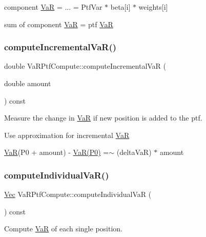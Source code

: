 component \hyperlink{classVaR}{VaR} = ... = Ptf\+Var $\ast$ beta\mbox{[}i\mbox{]} $\ast$ weights\mbox{[}i\mbox{]}

sum of component \hyperlink{classVaR}{VaR} = ptf \hyperlink{classVaR}{VaR} \hypertarget{classVaRPtfCompute_a21a920a3cd05000dbb4aa504ee0f7bc1}{}\label{classVaRPtfCompute_a21a920a3cd05000dbb4aa504ee0f7bc1} 
\subsubsection{\texorpdfstring{compute\+Incremental\+Va\+R()}{computeIncrementalVaR()}}
{\footnotesize\ttfamily double Va\+R\+Ptf\+Compute\+::compute\+Incremental\+VaR (\begin{DoxyParamCaption}\item[{double}]{amount }\end{DoxyParamCaption}) const}



Measure the change in \hyperlink{classVaR}{VaR} if new position is added to the ptf. 

Use approximation for incremental \hyperlink{classVaR}{VaR}

\hyperlink{classVaR}{VaR}(P0 + amount) -\/ \hyperlink{classVaR}{Va\+R(\+P0)} =$\sim$ (delta\+VaR)\textquotesingle{} $\ast$ amount \hypertarget{classVaRPtfCompute_a80964859df50e96558c08445020505cf}{}\label{classVaRPtfCompute_a80964859df50e96558c08445020505cf} 
\subsubsection{\texorpdfstring{compute\+Individual\+Va\+R()}{computeIndividualVaR()}}
{\footnotesize\ttfamily \hyperlink{compute__returns__eigen_8h_a1eb6a9306ef406d7975f3cbf2e247777}{Vec} Va\+R\+Ptf\+Compute\+::compute\+Individual\+VaR (\begin{DoxyParamCaption}{ }\end{DoxyParamCaption}) const}



Compute \hyperlink{classVaR}{VaR} of each single position. 

\hypertarget{classVaRPtfCompute_ae7a1cb2765156b3c7eff7571b5cb8943}{}\label{classVaRPtfCompute_ae7a1cb2765156b3c7eff7571b5cb8943} 
